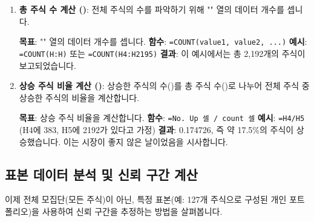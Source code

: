 \documentclass[11pt,a4paper]{article}
\theoremstyle{definition}
\newcommand{\code}[1]{\texttt{#1}}
\begin{document}
\begin{enumerate}
    \item \textbf{총 주식 수 계산 ()}:
    전체 주식의 수를 파악하기 위해 "" 열의 데이터 개수를 셉니다.
    \begin{examplebox}[title=Excel COUNT 함수 사용법]
        \textbf{목표}: "" 열의 데이터 개수를 셉니다.
        \textbf{함수}: \code{=COUNT(value1, value2, ...)}
        \textbf{예시}: \code{=COUNT(H:H)} 또는 \code{=COUNT(H4:H2195)}
        \textbf{결과}: 이 예시에서는 총 2,192개의 주식이 보고되었습니다.
    \end{examplebox}

    \item \textbf{상승 주식 비율 계산 ()}:
    상승한 주식의 수()를 총 주식 수()로 나누어 전체 주식 중 상승한 주식의 비율을 계산합니다.
    \begin{examplebox}[title=Excel 비율 계산]
        \textbf{목표}: 상승 주식 비율을 계산합니다.
        \textbf{함수}: \code{=No. Up 셀 / count 셀}
        \textbf{예시}: \code{=H4/H5} (H4에 383, H5에 2192가 있다고 가정)
        \textbf{결과}: 0.174726, 즉 약 17.5\%의 주식이 상승했습니다. 이는 시장이 좋지 않은 날이었음을 시사합니다.
    \end{examplebox}
\end{enumerate}

\subsection{표본 데이터 분석 및 신뢰 구간 계산}
이제 전체 모집단(모든 주식)이 아닌, 특정 표본(예: 127개 주식으로 구성된 개인 포트폴리오)을 사용하여 신뢰 구간을 추정하는 방법을 살펴봅니다.
\end{document}
